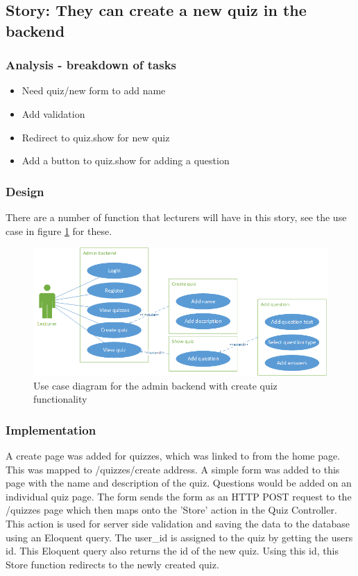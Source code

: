\subsection{Story: They can create a new quiz in the backend}
\subsubsection{Analysis - breakdown of tasks}
\begin{itemize}
	\item Need quiz/new form to add name
	\item Add validation
	\item Redirect to quiz.show for new quiz
	\item Add a button to quiz.show for adding a question
\end{itemize}
\subsubsection{Design}
There are a number of function that lecturers will have in this story, see the use case in figure \ref{fig:quiz-create-use-case} for these.
\begin{figure}
	\caption{Use case diagram for the admin backend with create quiz functionality}
	\centerline{\includegraphics{Chapter2/Iter-2/iter-2-use-case-create}}
	\label{fig:quiz-create-use-case}
\end{figure}
\subsubsection{Implementation}
A create page was added for quizzes, which was linked to from the home page. This was mapped to /quizzes/create address. A simple form was added to this page with the name and description of the quiz. Questions would be added on an individual quiz page. The form sends the form as an HTTP POST request to the /quizzes page which then maps onto the 'Store' action in the Quiz Controller. This action is used for server side validation and saving the data to the database using an Eloquent query. The user\_id is assigned to the quiz by getting the users id. This Eloquent query also returns the id of the new quiz. Using this id, this Store function redirects to the newly created quiz.

